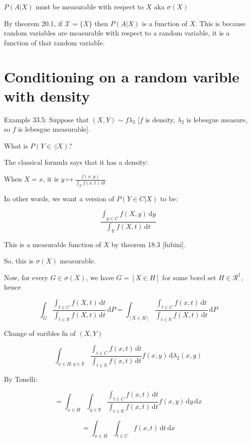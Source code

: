 \documentclass{article}
\theoremstyle{definition}
\begin{document}
\(P(A|X)\) must be measurable with respect to \(X\) aka \(\sigma(X)\)

By theorem 20.1, if \(\mathscr{X} =\{ X \} \) then \(P(A|X)\) is a function of \(X\). This is because random variables are measurable with respect to a random variable, it is a function of that random variable.

\section*{Conditioning on a random varible with density}

Example 33.5: Suppose that \((X,Y)\sim f \lambda_2\) [\(f\) is density, \(\lambda_2\) is lebesgue measure, so \(f\) is lebesgue measurable].

What is \(P(Y\in\cdot | X)\)?

The classical formula says that it has a density:

When \(X = x\), it is \(y \mapsto \frac{f(x,y)}{\int_{\mathbb{R}}^{} f(x,t) \,\mathrm{d}t }\) 

In other words, we want a version of \(P(Y\in C|X)\) to be:

\[
    \frac{\int_{y\in C}^{} f(X,y) \,\mathrm{d}y}{\int_{\mathbb{R}}^{} f(X,t) \,\mathrm{d}t }
\]

This is a measurable function of \(X\) by theorem 18.3 [fubini].

So, this is \(\sigma(X)\) measurable.

Now, for every \(G\in \sigma (X)\), we have \(G = [X\in H]\) for some borel set \(H\in \mathscr{R} ^1\), hence

\[
    \int_{G}^{} \frac{\int_{t\in C}^{} f(X,t) \,\mathrm{d}t}{\int_{t\in\mathbb{R}}^{} f(X,t) \,\mathrm{d}t } \,\mathrm{d}P = \int_{[X\in H]}^{} \frac{\int_{t\in C}^{} f(x,t) \,\mathrm{d}t }{\int_{t\in\mathbb{R} }^{} f(X,t) \,\mathrm{d}t } \,\mathrm{d}P  
\]

Change of varibles fn of \((X,Y)\) 

\[
    \int_{x\in H, y\in\mathbb{R}}^{} \frac{\int_{t\in C}^{} f(x,t) \,\mathrm{d}t}{\int_{t\in\mathbb{R} }^{} f(x,t) \,\mathrm{d}t } f(x,y) \,\mathrm{d}\lambda_2(x,y)
\]

By Tonelli:

\[
    = \int_{x\in H}^{} \int_{y\in\mathbb{R}}^{} \frac{\int_{t\in C}^{} f(x,t) \,\mathrm{d}t}{\int_{t\in\mathbb{R} }^{} f(x,t) \,\mathrm{d}t } f(x,y) \,\mathrm{d}y  \,\mathrm{d}x 
\]

\[
    = \int_{x\in H}^{} \int_{t\in C}^{} f(x,t) \,\mathrm{d}t  \,\mathrm{d}x 
\]
\end{document}
